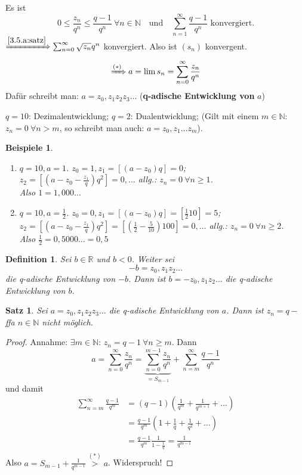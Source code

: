 \documentclass[12pt]{extreport} %
\newcommand{\N}{\mathbb{N}}
\newcommand{\R}{\mathbb{R}}
\theoremstyle{named}
\theoremstyle{dotless}
\newtheorem{satz}[unnamedtheorem]{Satz}
\newtheorem*{beispiele}{Beispiele}
\newtheorem*{definition}{Definition}
\begin{document}
Es ist
	$$ 0 \leq \frac{z_{n}}{q^{n}} \leq \frac{q - 1}{q^n} ~\forall n \in \N \quad \text{und} \quad \sum_{n=1}^{\infty} \frac{q - 1}{q^{n}} \text{ konvergiert}. $$
$\xRightarrow[]{\ref{3.5.a:satz}} \sum_{n=0}^{\infty}\sqrt{z_{n}}{q^{n}}$ konvergiert. Also ist $(s_{n})$ konvergent.
	$$ \xRightarrow[]{(*)} a = \lim s_{n} = \sum_{n=0}^{\infty} \frac{z_{n}}{q^{n}} $$
Dafür schreibt man: $a = z_{0}, z_{1} z_{2} z_{3} \dotsc$ (\textbf{q-adische Entwicklung von }$a$)

$q = 10$: Dezimalentwicklung; $q = 2$: Dualentwicklung; (Gilt mit einem $m \in \N$: $z_{n} = 0 ~\forall n > m$, so schreibt man auch: $a = z_{0}, z_{1} \dotsc z_{m}$).


\begin{beispiele} ~\
	\begin{enumerate}
		\item $q = 10, a = 1$. $z_{0} = 1, z_{1} = [(a - z_{0})q] = 0$; \\
			$z_{2} = [(a - z_{0} - \frac{z_{1}}{q})q^{2}] = 0, \dotsc$ allg.: $z_{n} = 0 ~\forall n \geq 1$. \\
			Also $1 = 1,000\dotsc$
		\item $q = 10, a = \frac{1}{2}$. $z_{0} = 0, z_{1} = [(a - z_{0})q] = [\frac{1}{2} 10] = 5$; \\
			$z_{2} = [(a - z_{0} - \frac{z_{1}}{q})q^{2}] = [(\frac{1}{2} - \frac{5}{10}) 100] = 0, \dotsc$ allg.: $z_{n} = 0 ~\forall n \geq 2$. \\
			Also $\frac{1}{2} = 0,5000\dotsc = 0,5$
	\end{enumerate}
\end{beispiele}


\begin{definition}
	Sei $b \in \R$ und $b < 0$. Weiter sei
		$$ -b = z_{0}, z_{1} z_{2} \dotsc $$
	die q-adische Entwicklung von $-b$. Dann ist $b = - z_{0}, z_{1} z_{2} \dotsc$ die q-adische Entwicklung von $b$.
\end{definition}


\begin{satz} \label{5.2:satz}
	Sei $a = z_{0}, z_{1} z_{2} z_{3} \dotsc$ die q-adische Entwicklung von $a$. Dann ist $z_{n} = q -$ ffa $n \in \N$ nicht möglich.
\end{satz}

\begin{proof}
	Annahme: $\exists m \in \N$: $z_{n} = q - 1 ~\forall n \geq m$. Dann 
		$$ a = \sum_{n=0}^{\infty} \frac{z_{n}}{q^{n}} = \underbrace{\sum_{n=0}^{m-1} \frac{z_{n}}{q^{n}}}_{= S_{m-1}} + \sum_{n=m}^{\infty} \frac{q-1}{q^{n}} $$
	und damit
	\begin{align*}
		\sum_{n=m}^{\infty} \frac{q-1}{q^{m}} & = (q-1) \left( \frac{1}{q^{m}} + \frac{1}{q^{m+1}} + \dotsc \right) \\
			& = \frac{q - 1}{q^{m}} (1 + \frac{1}{q} + \frac{1}{q^{2}} + \dotsc) \\
			& = \frac{q - 1}{q^{m}} \frac{1}{1 - \frac{1}{q}} = \frac{1}{q^{m-1}}
	\end{align*} 
	Also $a = S_{m-1} + \frac{1}{q^{m-1}} \overset{(*)}{>} a$. Widerspruch!
\end{proof}
\end{document}
